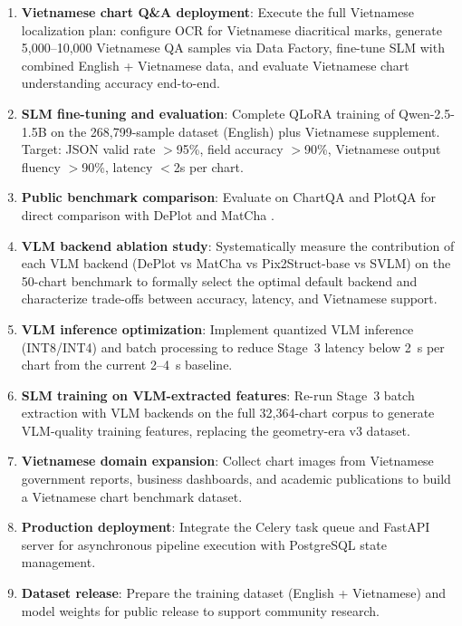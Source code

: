 \begin{enumerate}
    \item \textbf{Vietnamese chart Q\&A deployment}: Execute the full Vietnamese
          localization plan: configure OCR for Vietnamese diacritical marks, generate
          5,000--10,000 Vietnamese QA samples via Data Factory, fine-tune SLM with
          combined English + Vietnamese data, and evaluate Vietnamese chart understanding
          accuracy end-to-end.

    \item \textbf{SLM fine-tuning and evaluation}: Complete QLoRA training of
          Qwen-2.5-1.5B on the 268,799-sample dataset (English) plus Vietnamese
          supplement. Target: JSON valid rate $>$95\%, field accuracy $>$90\%,
          Vietnamese output fluency $>$90\%, latency $<$2s per chart.

    \item \textbf{Public benchmark comparison}: Evaluate on ChartQA
          \cite{masry2022chartqa} and PlotQA \cite{methani2020plotqa} for direct
          comparison with DePlot \cite{liu2023deplot} and MatCha \cite{lee2023matcha}.

    \item \textbf{VLM backend ablation study}: Systematically measure the contribution
          of each VLM backend (DePlot vs MatCha vs Pix2Struct-base vs SVLM) on the
          50-chart benchmark to formally select the optimal default backend and
          characterize trade-offs between accuracy, latency, and Vietnamese support.

    \item \textbf{VLM inference optimization}: Implement quantized VLM inference
          (INT8/INT4) and batch processing to reduce Stage~3 latency below 2~s
          per chart from the current 2--4~s baseline.

    \item \textbf{SLM training on VLM-extracted features}: Re-run Stage~3 batch
          extraction with VLM backends on the full 32,364-chart corpus to generate
          VLM-quality training features, replacing the geometry-era v3 dataset.

    \item \textbf{Vietnamese domain expansion}: Collect chart images from Vietnamese
          government reports, business dashboards, and academic publications to build
          a Vietnamese chart benchmark dataset.

    \item \textbf{Production deployment}: Integrate the Celery task queue and FastAPI
          server for asynchronous pipeline execution with PostgreSQL state management.

    \item \textbf{Dataset release}: Prepare the training dataset (English + Vietnamese)
          and model weights for public release to support community research.
\end{enumerate}